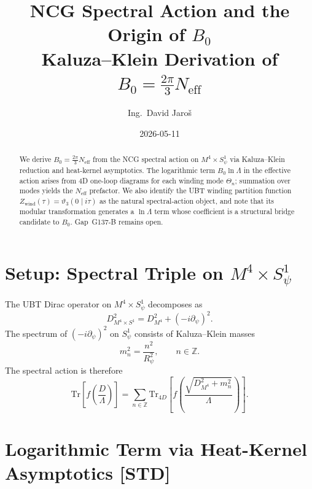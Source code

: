 \documentclass[12pt,a4paper]{article}
\title{\textbf{NCG Spectral Action and the Origin of $B_0$}\\
{\large Kaluza--Klein Derivation of $B_0 = \tfrac{2\pi}{3}N_{\mathrm{eff}}$}}
\author{Ing.\ David Jaro\v{s}}
\date{2026-05-11}
\theoremstyle{remark}
\newcommand{\STD}{\textbf{[STD]}}
\begin{document}
\maketitle

\begin{abstract}
We derive $B_0 = \tfrac{2\pi}{3}N_{\mathrm{eff}}$ from the NCG spectral action
on $M^4\times S^1_\psi$ via Kaluza--Klein reduction and heat-kernel asymptotics.
The logarithmic term $B_0\ln\Lambda$ in the effective action arises from 4D
one-loop diagrams for each winding mode $\Theta_n$; summation over modes yields
the $N_{\mathrm{eff}}$ prefactor.
We also identify the UBT winding partition function
$Z_{\mathrm{wind}}(\tau) = \vartheta_3(0\mid i\tau)$ as the natural
spectral-action object, and note that its modular transformation
generates a $\ln\Lambda$ term whose coefficient is a structural
bridge candidate to $B_0$.  Gap~G137-B remains open.
\end{abstract}

\section{Setup: Spectral Triple on $M^4\times S^1_\psi$}
\label{sec:setup}

The UBT Dirac operator on $M^4\times S^1_\psi$ decomposes as
\begin{equation}
  D_{M^4\times S^1}^2 = D_{M^4}^2 + (-i\partial_\psi)^2.
  \label{eq:D2}
\end{equation}
The spectrum of $(-i\partial_\psi)^2$ on $S^1_\psi$ consists of
Kaluza--Klein masses
\begin{equation}
  m_n^2 = \frac{n^2}{R_\psi^2}, \qquad n\in\mathbb{Z}.
  \label{eq:KKspectrum}
\end{equation}
The spectral action is therefore
\begin{equation}
  \mathrm{Tr}\!\left[f\!\left(\frac{D}{{\Lambda}}\right)\right]
  = \sum_{n\in\mathbb{Z}}
    \mathrm{Tr}_{4D}\!\left[f\!\left(\frac{\sqrt{D_{M^4}^2 + m_n^2}}{\Lambda}\right)\right].
  \label{eq:spectral_KK}
\end{equation}

\section{Logarithmic Term via Heat-Kernel Asymptotics \STD}
\label{sec:heatkernel}
\end{document}
